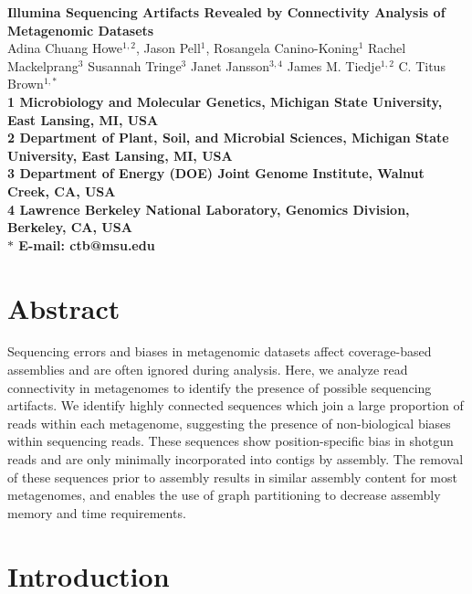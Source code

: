 \documentclass[10pt]{article}
\date{}
\begin{document}
\begin{flushleft}
{\Large \textbf{Illumina Sequencing Artifacts Revealed by Connectivity
    Analysis of Metagenomic Datasets} }
\\
Adina Chuang Howe$^{1,2}$, 
Jason Pell$^{1}$,
Rosangela Canino-Koning$^{1}$
Rachel Mackelprang$^{3}$
Susannah Tringe$^{3}$
Janet Jansson$^{3,4}$ 
James M. Tiedje$^{1,2}$
C. Titus Brown$^{1,\ast}$
\\
\bf{1} Microbiology and Molecular Genetics, Michigan State University, East Lansing, MI, USA
\\
\bf{2} Department of Plant, Soil, and Microbial Sciences, Michigan State University, East Lansing, MI, USA
\\
\bf{3} Department of Energy (DOE) Joint Genome Institute, Walnut Creek, CA, USA
\\
\bf{4} Lawrence Berkeley National Laboratory, Genomics Division, Berkeley, CA, USA
\\
$\ast$ E-mail: ctb@msu.edu
\end{flushleft}

\section*{Abstract}

Sequencing errors and biases in metagenomic datasets affect
coverage-based assemblies and are often ignored during analysis.
Here, we analyze read connectivity in metagenomes to identify the
presence of possible sequencing artifacts.  We identify highly
connected sequences which join a large proportion of reads within each
metagenome, suggesting the presence of non-biological biases within
sequencing reads.  These sequences show position-specific bias in
shotgun reads and are only minimally incorporated into contigs by
assembly.  The removal of these sequences prior to assembly results in
similar assembly content for most metagenomes, and enables the use of
graph partitioning to decrease assembly memory and time requirements.

\section*{Introduction}
\end{document}
